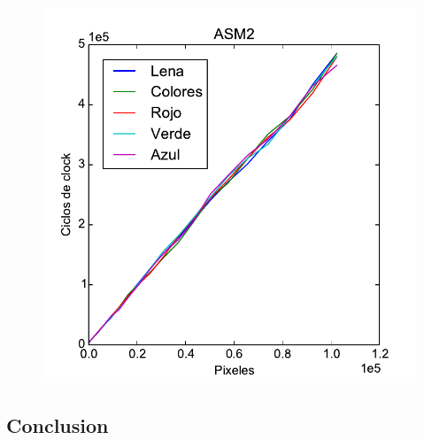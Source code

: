 \begin{figure}[h!]
	\includegraphics[scale=0.45]{images/asm2_merge_lena_colors}
\end{figure}

\subsection{Conclusion}